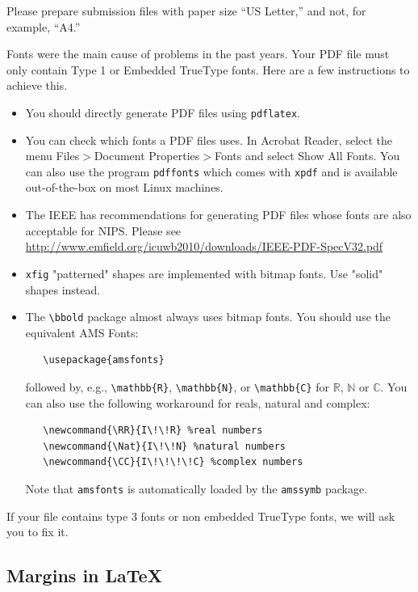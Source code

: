 \documentclass{article}
\begin{document}
Please prepare submission files with paper size ``US Letter,'' and
not, for example, ``A4.''

Fonts were the main cause of problems in the past years. Your PDF file
must only contain Type 1 or Embedded TrueType fonts. Here are a few
instructions to achieve this.

\begin{itemize}

\item You should directly generate PDF files using \verb+pdflatex+.

\item You can check which fonts a PDF files uses.  In Acrobat Reader,
  select the menu Files$>$Document Properties$>$Fonts and select Show
  All Fonts. You can also use the program \verb+pdffonts+ which comes
  with \verb+xpdf+ and is available out-of-the-box on most Linux
  machines.

\item The IEEE has recommendations for generating PDF files whose
  fonts are also acceptable for NIPS. Please see
  \url{http://www.emfield.org/icuwb2010/downloads/IEEE-PDF-SpecV32.pdf}

\item \verb+xfig+ "patterned" shapes are implemented with bitmap
  fonts.  Use "solid" shapes instead.

\item The \verb+\bbold+ package almost always uses bitmap fonts.  You
  should use the equivalent AMS Fonts:
\begin{verbatim}
   \usepackage{amsfonts}
\end{verbatim}
followed by, e.g., \verb+\mathbb{R}+, \verb+\mathbb{N}+, or
\verb+\mathbb{C}+ for $\mathbb{R}$, $\mathbb{N}$ or $\mathbb{C}$.  You
can also use the following workaround for reals, natural and complex:
\begin{verbatim}
   \newcommand{\RR}{I\!\!R} %real numbers
   \newcommand{\Nat}{I\!\!N} %natural numbers
   \newcommand{\CC}{I\!\!\!\!C} %complex numbers
\end{verbatim}
Note that \verb+amsfonts+ is automatically loaded by the
\verb+amssymb+ package.

\end{itemize}

If your file contains type 3 fonts or non embedded TrueType fonts, we
will ask you to fix it.

\subsection{Margins in \LaTeX{}}
\end{document}
